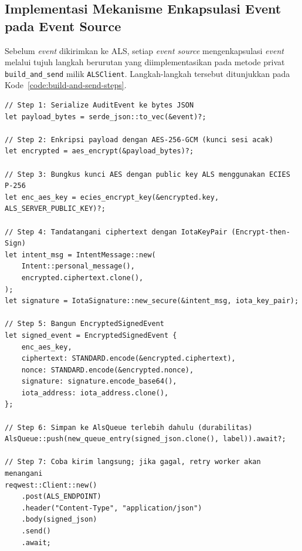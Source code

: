 \label{code:audit-batch}

\subsection{Implementasi Mekanisme Enkapsulasi Event pada Event Source}
\label{subsec:impl-enkapsulasi-event}

Sebelum \textit{event} dikirimkan ke ALS, setiap \textit{event source}
mengenkapsulasi \textit{event} melalui tujuh langkah berurutan yang
diimplementasikan pada metode privat \texttt{build\_and\_send} milik
\texttt{ALSClient}. Langkah-langkah tersebut ditunjukkan pada
Kode~\ref{code:build-and-send-steps}.

\begin{listing}[ht]
\caption{Alur enkapsulasi \textit{event} pada \texttt{ALSClient::build\_and\_send}}
\label{code:build-and-send-steps}
\begin{verbatim}
// Step 1: Serialize AuditEvent ke bytes JSON
let payload_bytes = serde_json::to_vec(&event)?;

// Step 2: Enkripsi payload dengan AES-256-GCM (kunci sesi acak)
let encrypted = aes_encrypt(&payload_bytes)?;

// Step 3: Bungkus kunci AES dengan public key ALS menggunakan ECIES P-256
let enc_aes_key = ecies_encrypt_key(&encrypted.key, ALS_SERVER_PUBLIC_KEY)?;

// Step 4: Tandatangani ciphertext dengan IotaKeyPair (Encrypt-then-Sign)
let intent_msg = IntentMessage::new(
    Intent::personal_message(),
    encrypted.ciphertext.clone(),
);
let signature = IotaSignature::new_secure(&intent_msg, iota_key_pair);

// Step 5: Bangun EncryptedSignedEvent
let signed_event = EncryptedSignedEvent {
    enc_aes_key,
    ciphertext: STANDARD.encode(&encrypted.ciphertext),
    nonce: STANDARD.encode(&encrypted.nonce),
    signature: signature.encode_base64(),
    iota_address: iota_address.clone(),
};

// Step 6: Simpan ke AlsQueue terlebih dahulu (durabilitas)
AlsQueue::push(new_queue_entry(signed_json.clone(), label)).await?;

// Step 7: Coba kirim langsung; jika gagal, retry worker akan menangani
reqwest::Client::new()
    .post(ALS_ENDPOINT)
    .header("Content-Type", "application/json")
    .body(signed_json)
    .send()
    .await;
\end{verbatim}
\end{listing}

